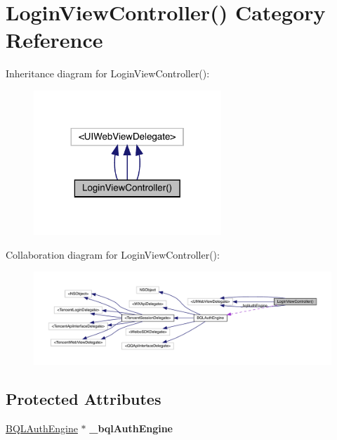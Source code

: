\hypertarget{category_login_view_controller_07_08}{}\section{Login\+View\+Controller() Category Reference}
\label{category_login_view_controller_07_08}


Inheritance diagram for Login\+View\+Controller()\+:\nopagebreak
\begin{figure}[H]
\begin{center}
\leavevmode
\includegraphics[width=200pt]{category_login_view_controller_07_08__inherit__graph}
\end{center}
\end{figure}


Collaboration diagram for Login\+View\+Controller()\+:\nopagebreak
\begin{figure}[H]
\begin{center}
\leavevmode
\includegraphics[width=350pt]{category_login_view_controller_07_08__coll__graph}
\end{center}
\end{figure}
\subsection*{Protected Attributes}
\begin{DoxyCompactItemize}
\item 
\mbox{\label{category_login_view_controller_07_08_ad4a1f3eb0105f1d2e8069e6b980382e1}} 
\mbox{\hyperlink{interface_b_q_l_auth_engine}{B\+Q\+L\+Auth\+Engine}} $\ast$ {\bfseries \+\_\+bql\+Auth\+Engine}
\end{DoxyCompactItemize}
